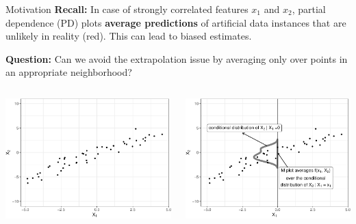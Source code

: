 \documentclass[11pt,compress,t,notes=noshow, xcolor=table]{beamer}
\begin{document}
\begin{vbframe}{Motivation}
\textbf{Recall:} In case of strongly correlated features $x_1$ and $x_2$, partial dependence (PD) plots \textbf{average predictions} of artificial data instances that are unlikely in reality (red).
This can lead to biased estimates.

\lz

\textbf{Question:} Can we avoid the extrapolation issue by averaging only over points in an appropriate neighborhood? %

\framebreak

\begin{columns}[T]
\begin{column}{0.5\textwidth}
\centering
\includegraphics[width=\textwidth]{figure_man/ale_scatter}
\end{column}
\begin{column}{0.5\textwidth}
\centering
\includegraphics[width=\textwidth]{figure_man/ale_mplot}
\end{column}
\end{columns}


\end{vbframe}
\end{document}

